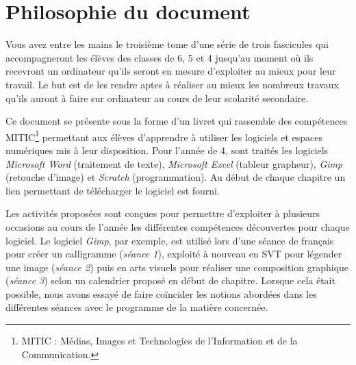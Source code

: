 \chapter*{Philosophie du document}



Vous avez entre les mains le troisième tome d'une série de trois fascicules qui accompagneront les élèves des classes de 6, 5 et 4 jusqu'au moment où ils recevront un ordinateur qu'ils seront en mesure d'exploiter au mieux pour leur travail. Le but est de les rendre aptes à réaliser au mieux les nombreux travaux qu'ils auront à faire sur ordinateur au cours de leur scolarité secondaire.

\vspace{18pt}

Ce document se présente sous la forme d'un livret qui rassemble des compétences MITIC\footnote{MITIC : Médias, Images et Technologies de l'Information et de la Communication.} permettant aux élèves d'apprendre à utiliser les logiciels et espaces numériques mis à leur disposition. Pour l'année de 4, sont traités les logiciels \emph{Microsoft Word} (traitement de texte), \emph{Microsoft Excel} (tableur grapheur), \emph{Gimp} (retouche d'image) et \emph{Scratch} (programmation). Au début de chaque chapitre un lien permettant de télécharger le logiciel est fourni.

\vspace{18pt}

Les activités proposées sont conçues pour permettre d'exploiter à plusieurs occasions au cours de l'année les différentes compétences découvertes pour chaque logiciel. Le logiciel \emph{Gimp}, par exemple, est utilisé lors d'une séance de français pour créer un calligramme (\emph{séance 1}), exploité à nouveau en SVT pour légender une image (\emph{séance 2}) puis en arts visuels pour réaliser une composition graphique (\emph{séance 3}) selon un calendrier proposé en début de chapitre. Lorsque cela était possible, nous avons essayé de faire coïncider les notions abordées dans les différentes séances avec le programme de la matière concernée.


